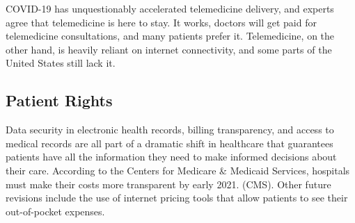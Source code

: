 \documentclass[12pt]{article}
\begin{document}
COVID-19 has unquestionably accelerated telemedicine delivery, and experts agree that telemedicine is here to stay. It works, doctors will get paid for telemedicine consultations, and many patients prefer it. Telemedicine, on the other hand, is heavily reliant on internet connectivity, and some parts of the United States still lack it.

\subsection{Patient Rights}

 Data security in electronic health records, billing transparency, and access to medical records are all part of a dramatic shift in healthcare that guarantees patients have all the information they need to make informed decisions about their care. According to the Centers for Medicare & Medicaid Services, hospitals must make their costs more transparent by early 2021. (CMS). Other future revisions include the use of internet pricing tools that allow patients to see their out-of-pocket expenses.
\end{document}
